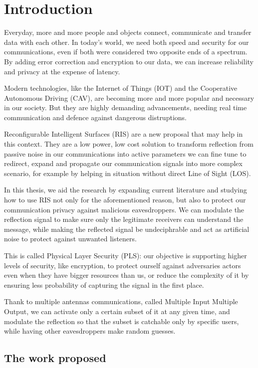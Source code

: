 \section{Introduction}

Everyday, more and more people and objects connect, communicate and transfer data with each other. In today's world, we need both speed and security for our communications, even if both were considered two opposite ends of a spectrum. By adding error correction and encryption to our data, we can increase reliability and privacy at the expense of latency.

Modern technologies, like the Internet of Things (IOT) and the Cooperative Autonomous Driving (CAV), are becoming more and more popular and necessary in our society. But they are highly demanding advancements, needing real time communication and defence against dangerous distruptions.

Reconfigurable Intelligent Surfaces (RIS) are a new proposal that may help in this context. They are a low power, low cost solution to transform reflection from passive noise in our communications into active parameters we can fine tune to redirect, expand and propagate our communication signals into more complex scenario, for example by helping in situation without direct Line of Sight (LOS).

In this thesis, we aid the research by expanding current literature and studying how to use RIS not only for the aforementioned reason, but also to protect our communication privacy against malicious eavesdroppers. We can modulate the reflection signal to make sure only the legitimate receivers can understand the message, while making the reflected signal be undeciphrable and act as artificial noise to protect against unwanted listeners.

This is called Physical Layer Security (PLS): our objective is supporting higher levels of security, like encryption, to protect ourself against adversaries actors even when they have bigger resources than us, or reduce the complexity of it by ensuring less probability of capturing the signal in the first place.

Thank to multiple antennas communications, called Multiple Input Multiple Output, we can activate only a certain subset of it at any given time, and modulate the reflection so that the subset is catchable only by specific users, while having other eavesdroppers make random guesses.

\subsection{The work proposed}

